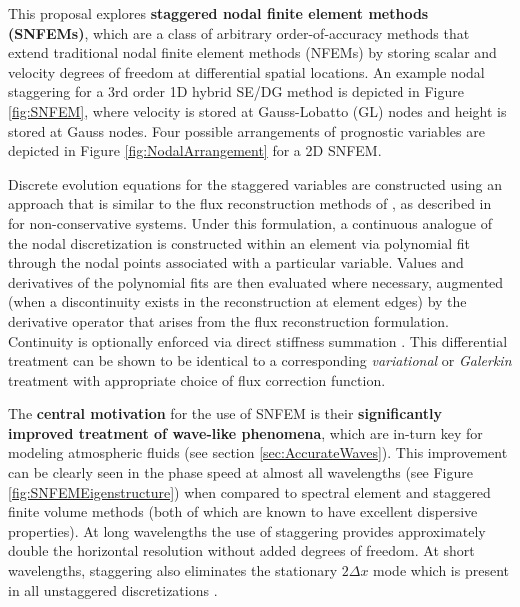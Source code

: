 \documentclass[11pt]{article}
\begin{document}
This proposal explores \textbf{staggered nodal finite element methods (SNFEMs)}, which are a class of arbitrary order-of-accuracy methods that extend traditional nodal finite element methods (NFEMs) by storing scalar and velocity degrees of freedom at differential spatial locations.  An example nodal staggering for a 3rd order 1D hybrid SE/DG method is depicted in Figure \ref{fig:SNFEM}, where velocity is stored at Gauss-Lobatto (GL) nodes and height is stored at Gauss nodes.  Four possible arrangements of prognostic variables are depicted in Figure \ref{fig:NodalArrangement} for a 2D SNFEM.

Discrete evolution equations for the staggered variables are constructed using an approach that is similar to the flux reconstruction methods of \cite{huynh2007flux}, as described in \cite{ullrich2014global} for non-conservative systems.  Under this formulation, a continuous analogue of the nodal discretization is constructed within an element via polynomial fit through the nodal points associated with a particular variable.  Values and derivatives of the polynomial fits are then evaluated where necessary, augmented (when a discontinuity exists in the reconstruction at element edges) by the derivative operator that arises from the flux reconstruction formulation.  Continuity is optionally enforced via direct stiffness summation \cite{ronquist1987spectral}.  This differential treatment can be shown to be identical to a corresponding \textit{variational} or \textit{Galerkin} treatment with appropriate choice of flux correction function.

The \textbf{central motivation} for the use of SNFEM is their \textbf{significantly improved treatment of wave-like phenomena}, which are in-turn key for modeling atmospheric fluids (see section \ref{sec:AccurateWaves}).  This improvement can be clearly seen in the phase speed at almost all wavelengths (see Figure \ref{fig:SNFEMEigenstructure}) when compared to spectral element and staggered finite volume methods (both of which are known to have excellent dispersive properties).  At long wavelengths the use of staggering provides approximately double the horizontal resolution without added degrees of freedom.  At short wavelengths, staggering also eliminates the stationary $2 \Delta x$ mode which is present in all unstaggered discretizations \cite{melvin2012dispersion, ullrich2014understanding}.
\end{document}
